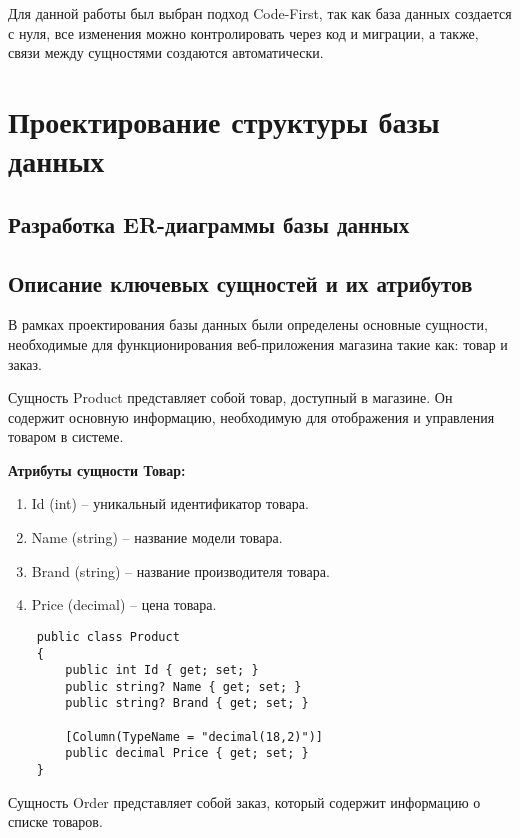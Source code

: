 \documentclass[a4paper,12pt]{report}
\begin{document}
Для данной работы был выбран подход Code-First, так как база данных создается с нуля, все изменения можно контролировать через код и миграции,
а также, связи между сущностями создаются автоматически.

\section{Проектирование структуры базы данных}

\subsection{Разработка ER-диаграммы базы данных}


\subsection{Описание ключевых сущностей и их атрибутов}

В рамках проектирования базы данных были определены основные сущности, необходимые для функционирования веб-приложения магазина такие как: товар и заказ.

Сущность Product представляет собой товар, доступный в магазине. Он содержит основную информацию, необходимую для отображения и управления товаром в системе.

\textbf{Атрибуты сущности Товар:}
\begin{enumerate}
    \item
        Id (int) -- уникальный идентификатор товара.
    \item
        Name (string) -- название модели товара.
    \item
        Brand (string) -- название производителя товара.
    \item
        Price (decimal) -- цена товара.
\end{enumerate}

\begin{verbatim}
    public class Product
    {
        public int Id { get; set; } 
        public string? Name { get; set; }
        public string? Brand { get; set; }  
    
        [Column(TypeName = "decimal(18,2)")]  
        public decimal Price { get; set; }  
    }
\end{verbatim}

Сущность Order представляет собой заказ, который содержит информацию о списке товаров.
\end{document}
